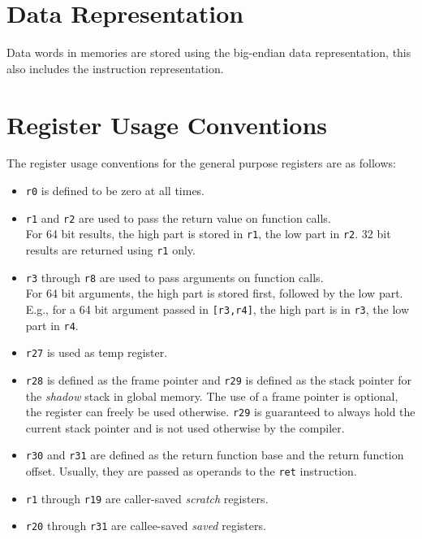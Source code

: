 \section{Data Representation}

Data words in memories are stored using the big-endian data representation, this
also includes the instruction representation.

\section{Register Usage Conventions}

The register usage conventions for the general purpose registers are as follows:
\begin{itemize}
  \item \texttt{r0} is defined to be zero at all times.
  \item \texttt{r1} and \texttt{r2} are used to pass the return value on
        function calls. \\
        For 64 bit results, the high part is stored in \texttt{r1},
        the low part in \texttt{r2}.
	32 bit results are returned using \texttt{r1} only.
  \item \texttt{r3} through \texttt{r8} are used to pass arguments on function
        calls. \\
        For 64 bit arguments, the high part is stored first,
        followed by the low part.\\ E.g., for a 64 bit argument passed in
        \texttt{[r3,r4]}, the high part is in \texttt{r3}, the low part
        in \texttt{r4}.
  \item \texttt{r27} is used as temp register.
  \item \texttt{r28} is defined as the frame pointer and \texttt{r29} is defined as the stack
        pointer for the \emph{shadow} stack in global memory. The use of a frame
        pointer is optional, the register can freely be used otherwise.
	\texttt{r29} is guaranteed to always hold the current stack pointer and is not used
	otherwise by the compiler.
  \item \texttt{r30} and \texttt{r31} are defined as the return function base
        and the return function offset.
        Usually, they are passed as operands to the \texttt{ret} instruction.
  \item \texttt{r1} through \texttt{r19} are caller-saved \emph{scratch}
        registers.
  \item \texttt{r20} through \texttt{r31} are callee-saved \emph{saved}
        registers.
\end{itemize}

